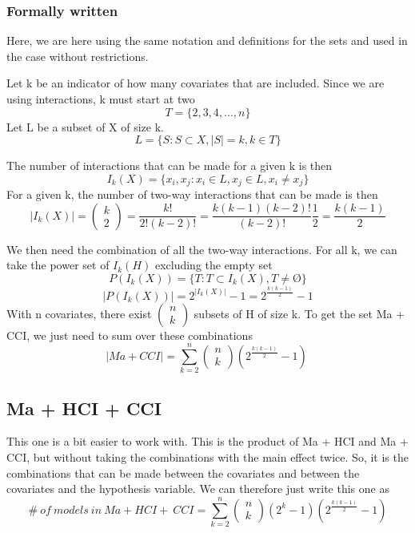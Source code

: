 \subsubsection{Formally written}

Here, we are here using the same notation and definitions for the sets and used in the case without restrictions. 

Let k be an indicator of how many covariates that are included. Since we are using interactions, k must start at two 
\[T=\{\left.2,3,4,\dots ,n\right.\}\] 
Let L be a subset of X of size k.
\[L=\{\left.S:S\subset X,\left|S\right|=k,k\in T\right.\}\] 

\noindent The number of interactions that can be made for a given k is then
\[I_k\left(X\right)=\{\left.\left.x_i,x_j\right.:x_i\in L,x_j\in L,x_i\neq x_j\right.\}\] 
For a given k, the number of two-way interactions that can be made is then
\[\left|I_k\left(X\right)\right|=\left( \begin{array}{c}
k \\ 
2 \end{array}
\right)=\frac{k!}{2!\left(k-2\right)!}=\frac{k\left(k-1\right)\left(k-2\right)!}{\left(k-2\right)!}\frac{1}{2}=\frac{k\left(k-1\right)}{2}\] 

We then need the combination of all the two-way interactions. For all k, we can take the power set of $I_k\left(H\right)$ excluding the empty set
\[P\left(I_k\left(X\right)\right)=\{\left.T:T\subset I_k\left(X\right),T\neq \textrm{\O}\right.\}\] 
\[\left|P\left(I_k\left(X\right)\right)\right|=2^{\left|I_k\left(X\right)\right|}-1=2^{\frac{k\left(k-1\right)}{2}}-1\] 
With n covariates, there exist $\left( \begin{array}{c}
n \\ 
k \end{array}
\right)$ subsets of H of size k. To get the set Ma + CCI, we just need to sum over these combinations
\[\left|Ma+CCI\right|=\sum^n_{k=2}{\left( \begin{array}{c}
n \\ 
k \end{array}
\right)}\left(2^{\frac{k\left(k-1\right)}{2}}-1\right)\ \] 

\subsection{Ma + HCI + CCI}
This one is a bit easier to work with. This is the product of Ma + HCI and Ma + CCI, but without taking the combinations with the main effect twice. So, it is the combinations that can be made between the covariates and between the covariates and the hypothesis variable. We can therefore just write this one as 
\[\#\ of\ models\ in\ Ma+HCI+\ CCI=\sum^n_{k=2}{\left( \begin{array}{c}
n \\ 
k \end{array}
\right)\left(2^k-1\right)\left(2^{\frac{k\left(k-1\right)}{2}}-1\right)}\] 
